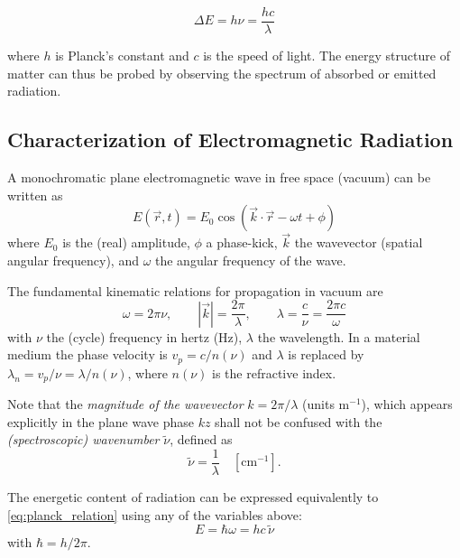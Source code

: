 \begin{equation}
	\Delta E = h\nu = \frac{hc}{\lambda}
	\label{eq:planck_relation}
\end{equation}

\noindent where $h$ is Planck's constant and $c$ is the speed of light. The energy structure of matter can thus be probed by observing the spectrum of absorbed or emitted radiation.

\subsection{Characterization of Electromagnetic Radiation}
\label{subsec:em_radiation_characterization}

\noindent A monochromatic plane electromagnetic wave in free space (vacuum) can be written as
\begin{equation}
	E(\vec{r},t) = E_0 \cos(\vec{k} \cdot \vec{r} - \omega t + \phi)
	\label{eq:plane_wave}
\end{equation}
where $E_0$ is the (real) amplitude, $\phi$ a phase-kick, $\vec{k}$ the wavevector (spatial angular frequency), and $\omega$ the angular frequency of the wave.

The fundamental kinematic relations for propagation in vacuum are
\begin{equation}
	\omega = 2\pi\nu, \qquad |\vec{k}| = \frac{2\pi}{\lambda}, \qquad \lambda = \frac{c}{\nu} = \frac{2\pi c}{\omega}
	\label{eq:wavelength_frequency_relation}
\end{equation}
with $\nu$ the (cycle) frequency in hertz (Hz), $\lambda$ the wavelength. In a material medium the phase velocity is $v_p = c/n(\nu)$ and $\lambda$ is replaced by $\lambda_n = v_p/\nu = \lambda/n(\nu)$, where $n(\nu)$ is the refractive index.

\noindent Note that the \emph{magnitude of the wavevector } $k = 2\pi/\lambda$ (units m$^{-1}$), which appears explicitly in the plane wave phase $kz$ shall not be confused with the \emph{(spectroscopic) wavenumber} $\tilde{\nu}$, defined as
\begin{equation}
	\tilde{\nu} = \frac{1}{\lambda} \quad [\mathrm{cm}^{-1}].
	\label{eq:wavenumber_definition}
\end{equation}

The energetic content of radiation can be expressed equivalently to \eqref{eq:planck_relation} using any of the variables above:
\begin{equation}
	E = \hbar\omega = h c \, \tilde{\nu}
	\label{eq:energy_wavenumber_conversion}
\end{equation}
with $\hbar = h/2\pi$.

